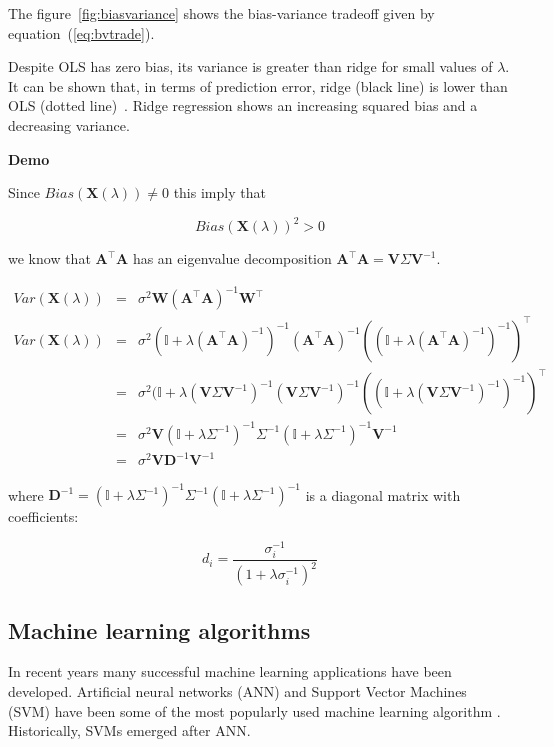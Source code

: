 The figure~\ref{fig:biasvariance} shows the bias-variance tradeoff
given by equation~(\ref{eq:bvtrade}). 

Despite OLS has zero bias,
its variance is greater than ridge for small values of $\lambda$.
It can be shown that, in terms of prediction error, ridge (black line)
is lower than OLS (dotted line)~\cite{hoerl1970}. Ridge regression shows an
increasing squared bias and a decreasing variance.

\textbf{Demo}\quad

Since $Bias(\mathbf{X}(\lambda)) \neq 0$ this imply that

\begin{equation*}
Bias(\mathbf{X}(\lambda)) ^2 > 0 
\end{equation*}

\noindent we know that $\mathbf{A}^\top
\mathbf{A}$ has an eigenvalue decomposition $\mathbf{A}^\top
\mathbf{A} = \mathbf{V} \Sigma \mathbf{V}^{-1}$.


\begin{eqnarray*}
Var(\mathbf{X}(\lambda)) &=& \sigma^2 \mathbf{W}(\mathbf{A}^\top \mathbf{A} )^{-1}\mathbf{W}^\top\\
Var(\mathbf{X}(\lambda)) &=& \sigma^2 (\mathbb{I} + \lambda (\mathbf{A}^\top
\mathbf{A})^{-1})^{-1} (\mathbf{A}^\top \mathbf{A} )^{-1}((\mathbb{I} + \lambda (\mathbf{A}^\top
\mathbf{A})^{-1})^{-1} )^\top \\
&=& \sigma^2 (\mathbb{I} + \lambda (\mathbf{V} \Sigma \mathbf{V}^{-1})^{-1} (\mathbf{V} \Sigma \mathbf{V}^{-1})^{-1}((\mathbb{I} + \lambda (\mathbf{V} \Sigma \mathbf{V}^{-1})^{-1})^{-1} )^\top \\
&=& \sigma^2 \mathbf{V} (\mathbb{I} + \lambda \Sigma^{-1})^{-1} \Sigma^{-1} (\mathbb{I} + \lambda \Sigma^{-1})^{-1}  \mathbf{V}^{-1}\\
&=& \sigma^2 \mathbf{V} \mathbf{D}^{-1} \mathbf{V}^{-1}
\end{eqnarray*}

\noindent where $\mathbf{D}^{-1}  = (\mathbb{I} + \lambda \Sigma^{-1})^{-1} \Sigma^{-1} (\mathbb{I} + \lambda \Sigma^{-1})^{-1}$ is a diagonal matrix with coefficients:

\begin{equation*}
d_i = \frac{\sigma_i^{-1}}{(1+\lambda\sigma_i^{-1})^2}
\end{equation*}

\subsection{Machine learning algorithms}
In recent years many successful machine learning applications have been developed. Artificial neural networks (ANN) and Support Vector Machines (SVM) have been some of the most popularly used machine learning algorithm \cite{haykin1998}. Historically, SVMs emerged after ANN.

